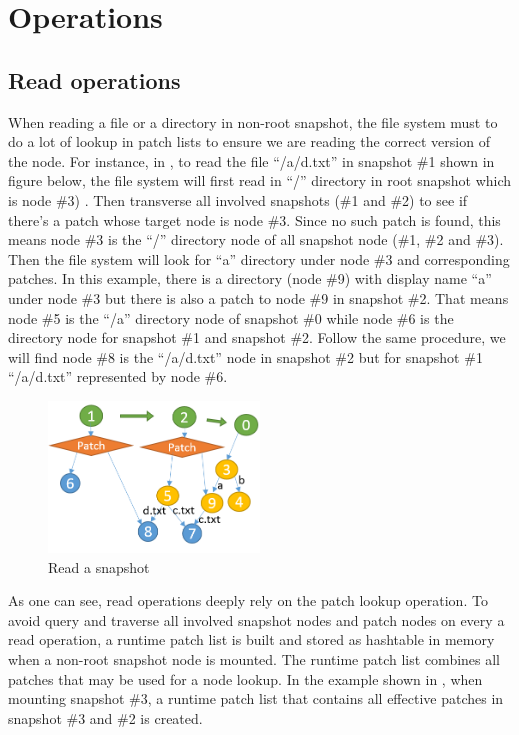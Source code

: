 \section{Operations}
\subsection{Read operations}

    When reading a file or a directory in non-root snapshot, the file system must to do a lot of lookup in patch lists to ensure we are reading the correct version of the node. For instance, in  , to read the file “/a/d.txt” in snapshot \#1 shown in figure below, the file system will first read in “/” directory in root snapshot which is node \#3) . Then transverse all involved snapshots (\#1 and \#2) to see if there’s a patch whose target node is node \#3. Since no such patch is found, this means node \#3 is the “/” directory node of all snapshot node (\#1, \#2 and \#3). Then the file system will look for “a” directory under node \#3 and corresponding patches. In this example, there is a directory (node \#9) with display name “a” under node \#3 but there is also a patch to node \#9 in snapshot \#2. That means node \#5 is the “/a” directory node of snapshot \#0 while node \#6 is the directory node for snapshot \#1 and snapshot \#2. Follow the same procedure, we will find node \#8 is the “/a/d.txt” node in snapshot \#2 but for snapshot \#1 “/a/d.txt” represented by node \#6.

\begin{figure}[hbtp]
\centering
\includegraphics[width=0.5\textwidth]{Chapter-4/figs/fig18.png}
\caption{Read a snapshot}
\label{fig:read_patches}
\end{figure}

    As one can see, read operations deeply rely on the patch lookup operation. To avoid query and traverse all involved snapshot nodes and patch nodes on every a read operation, a runtime patch list is built and stored as hashtable in memory when a non-root snapshot node is mounted. The runtime patch list combines all patches that may be used for a node lookup. In the example shown in , when mounting snapshot \#3, a runtime patch list that contains all effective patches in snapshot \#3 and \#2 is created.

